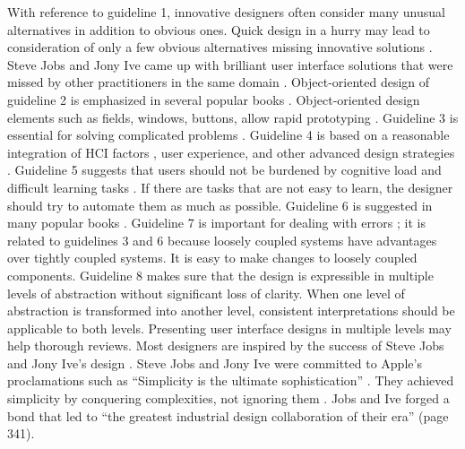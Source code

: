 \documentclass{article}
\begin{document}
With reference to guideline 1, innovative designers often consider many unusual alternatives in addition to obvious ones. Quick design in a hurry may lead to consideration of only a few obvious alternatives missing innovative solutions \cite{hong, isaacson}. Steve Jobs and Jony Ive came up with brilliant user interface solutions that were missed by other practitioners in the same 
domain \cite{hong, isaacson}. Object-oriented design of guideline 2 is emphasized in several popular books \cite{kung, pressman}.  Object-oriented design elements such as fields, windows, buttons, allow rapid prototyping \cite{kung, pressman}. Guideline 3 is essential for solving complicated problems \cite{ouster, pressman}.  Guideline 4 is based on a reasonable integration of HCI factors \cite{shneiderman}, user experience, and other advanced design strategies \cite{pressman, rumbaugh, shneiderman}. Guideline 5 suggests that users should not be burdened by cognitive load and difficult learning tasks \cite{pressman, shneiderman}. If there are tasks that are not easy to learn, the designer should try to automate them as much as possible. Guideline 6 is suggested in many popular 
books \cite{kung, pressman}. Guideline 7 is important for dealing with errors \cite{braude, kung, ouster, pfleeger, pressman, rumbaugh, shneiderman, sommerville}; it is related to guidelines 3 and 6 because loosely coupled systems have advantages over tightly coupled systems. It is easy to make changes to loosely coupled components. Guideline 8 makes sure that the design is expressible in multiple levels of abstraction without significant loss of clarity. When one level of abstraction is transformed into another level, consistent interpretations should be
applicable to both levels. Presenting user interface designs in multiple levels may help thorough reviews.  Most designers are inspired by the success of Steve Jobs and Jony Ive’s design \cite{hong, isaacson}.  Steve Jobs and Jony Ive were committed to Apple’s proclamations such as “Simplicity is the ultimate sophistication” \cite{isaacson}. They achieved simplicity by conquering complexities, not ignoring them \cite{isaacson}. Jobs and Ive forged a bond that led to “the greatest industrial design collaboration of their era” \cite{isaacson} (page 341).  
\end{document}
